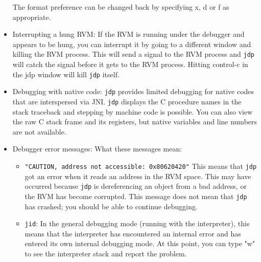 \begin{itemize}
  The format preference can be changed back by specifying x, d or f
  as appropriate.

\item Interrupting a hung RVM:  If the RVM is running under the debugger
  and appears to be hung, you can interrupt it by going to a different
  window and killing the RVM process.  This will send a signal to the
  RVM process and {\tt jdp} will catch the signal before it gets to
  the RVM process.  Hitting control-c in the jdp window will kill 
  {\tt jdp} itself.


\item Debugging with native code:  {\tt jdp} provides limited debugging
  for native codes that are interspersed via JNI.  {\tt jdp}
  displays the C procedure names in the stack traceback and stepping by 
  machine code is possible.  You can also view the raw C stack frame and 
  its registers, but native variables and line numbers are not available.




\item Debugger error messages:
  What these messages mean:

\begin{itemize}
\item {\tt "CAUTION, address not accessible: 0x80620420"}
        This means that {\tt jdp} got an error when it reads an address
        in the RVM space.  This may have occurred because {\tt jdp} is 
        dereferencing an object from a bad address, or the RVM has
        become corrupted.  This message does not mean that {\tt jdp}
        has crashed; you should be able to continue debugging.

\item {\tt jid}:
        In the general debugging mode (running with the interpreter),
        this means that the interpreter has encountered an internal 
        error and has entered its own internal debugging mode.  At this 
        point, you can type "w" to see the interpreter stack and report
        the problem.
\end{itemize}
\end{itemize}

